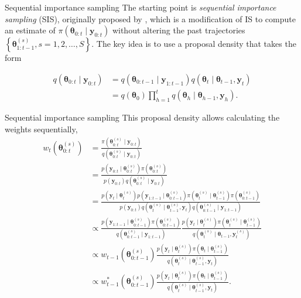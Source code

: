 \documentclass[12pt, compress]{beamer}
\begin{document}
\begin{frame}{Sequential importance sampling}
The starting point is \textit{sequential importance sampling} (SIS), originally proposed by \cite{handschin1969monte}, which is a modification of IS to compute an estimate of $\pi(\bm{\theta}_{0:t}\mid \bm{y}_{0:t})$ without altering the past trajectories $\left\{\bm{\theta}^{(s)}_{1:t-1}, s=1,2,\dots,S\right\}$. The key idea is to use a proposal density that takes the form

\begin{align*}
	q(\bm{\theta}_{0:t}\mid \bm{y}_{0:t}) &= q(\bm{\theta}_{0:t-1}\mid \bm{y}_{1:t-1})q(\bm{\theta}_t\mid \bm{\theta}_{t-1},\bm{y}_{t}) \\
	&= q(\bm{\theta}_0)\prod_{h=1}^{t}q(\bm{\theta}_h\mid \bm{\theta}_{h-1},\bm{y}_{h}).
\end{align*}
\end{frame}

\begin{frame}{Sequential importance sampling}
This proposal density allows calculating the weights sequentially,
{\tiny{
\begin{align*}
	w_{t}(\bm{\theta}^{(s)}_{0:t})&=\frac{\pi(\bm{\theta}_{0:t}^{(s)}\mid \bm{y}_{0:t})}{q(\bm{\theta}_{0:t}^{(s)}\mid \bm{y}_{0:t})}\\
	&=\frac{p(\bm{y}_{0:t}\mid \bm{\theta}_{0:t}^{(s)})\pi(\bm{\theta}_{0:t}^{(s)})}{p(\bm{y}_{0:t})q(\bm{\theta}_{0:t}^{(s)}\mid \bm{y}_{0:t})}\\
	&=\frac{p(\bm{y}_{t}\mid \bm{\theta}_{t}^{(s)})p(\bm{y}_{1:t-1}\mid \bm{\theta}_{0:t-1}^{(s)})\pi(\bm{\theta}_{t}^{(s)}\mid \bm{\theta}_{t-1}^{(s)})\pi(\bm{\theta}_{0:t-1}^{(s)})}{p(\bm{y}_{0:t})q(\bm{\theta}_{t}^{(s)}\mid \bm{\theta}_{t-1}^{(s)},\bm{y}_{t})q(\bm{\theta}_{0:t-1}^{(s)}\mid \bm{y}_{1:t-1})}\\
	&\propto\frac{p(\bm{y}_{1:t-1}\mid \bm{\theta}_{0:t-1}^{(s)})\pi(\bm{\theta}_{0:t-1}^{(s)})}{q(\bm{\theta}_{0:t-1}^{(s)}\mid \bm{y}_{1:t-1})}\frac{p(\bm{y}_{t}\mid \bm{\theta}_{t}^{(s)})\pi(\bm{\theta}_{t}^{(s)}\mid \bm{\theta}_{t-1}^{(s)})}{q(\bm{\theta}_{t}^{(s)}\mid \bm{\theta}_{t-1},\bm{y}_{t}^{(s)})}\\
	&\propto w_{t-1}(\bm{\theta}^{(s)}_{0:t-1})\frac{p(\bm{y}_{t}\mid \bm{\theta}_{t}^{(s)})\pi(\bm{\theta}_{t}\mid \bm{\theta}_{t-1}^{(s)})}{q(\bm{\theta}_t^{(s)}\mid \bm{\theta}_{t-1}^{(s)},\bm{y}_{t})}\\
	&\propto w_{t-1}^*(\bm{\theta}^{(s)}_{0:t-1})\frac{p(\bm{y}_{t}\mid \bm{\theta}_{t}^{(s)})\pi(\bm{\theta}_{t}\mid \bm{\theta}_{t-1}^{(s)})}{q(\bm{\theta}_t^{(s)}\mid \bm{\theta}_{t-1}^{(s)},\bm{y}_{t})}.
\end{align*} 
}}
\end{frame}
\end{document}
